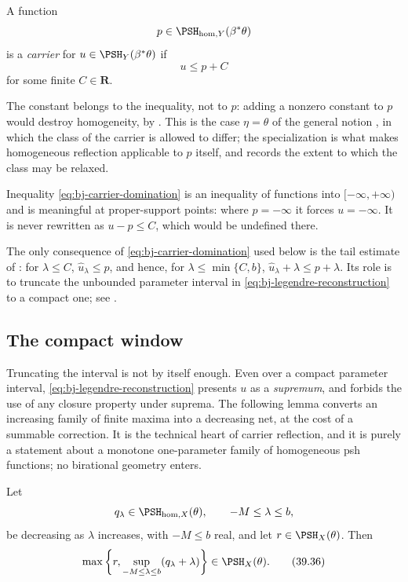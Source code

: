 \begin{definition}
\label{def:bj-homogeneous-carrier}
A function
\[
              p\in\PSH_{\mathrm{hom},Y}(\beta^*\theta)
\]
is a \emph{carrier} for $u\in\PSH_Y(\beta^*\theta)$ if
\[
                              u\le p+C
\tag{39.35}\label{eq:bj-carrier-domination}
\]
for some finite $C\in\mathbf R$.
\end{definition}

The constant belongs to the inequality, not to $p$: adding a nonzero
constant to $p$ would destroy homogeneity, by
.  This is the case
$\eta=\theta$ of the general notion , in which the
class of the carrier is allowed to differ; the specialization is what makes
homogeneous reflection applicable to $p$ itself, and
 records the extent to which the class
may be relaxed.

Inequality \eqref{eq:bj-carrier-domination} is an inequality of functions
into $[-\infty,+\infty)$ and is meaningful at proper-support points: where
$p=-\infty$ it forces $u=-\infty$.  It is never rewritten as
$u-p\le C$, which would be undefined there.

The only consequence of \eqref{eq:bj-carrier-domination} used below is the
tail estimate of : for $\lambda\le C$,
$\widehat u_\lambda\le p$, and hence, for
$\lambda\le\min\{C,b\}$,
$\widehat u_\lambda+\lambda\le p+\lambda$.  Its role is to truncate the
unbounded parameter interval in
\eqref{eq:bj-legendre-reconstruction} to a compact one; see
.

\subsection{The compact window}
\label{sec:ch39-window}

Truncating the interval is not by itself enough.  Even over a compact
parameter interval, \eqref{eq:bj-legendre-reconstruction} presents $u$ as
a \emph{supremum}, and  forbids the use of any
closure property under suprema.  The following lemma converts an increasing
family of finite maxima into a decreasing net, at the cost of a summable
correction.  It is the technical heart of carrier reflection, and it is
purely a statement about a monotone one-parameter family of homogeneous psh
functions; no birational geometry enters.

\begin{lemma}
\label{lem:bj-compact-legendre-window}
Let
\[
 q_\lambda\in\PSH_{\mathrm{hom},X}(\theta),
 \qquad -M\le\lambda\le b,
\]
be decreasing as $\lambda$ increases, with $-M\le b$ real, and let
$r\in\PSH_X(\theta)$.  Then
\[
 \max\left\{r,
   \sup_{-M\le\lambda\le b}(q_\lambda+\lambda)\right\}
 \in\PSH_X(\theta).
\tag{39.36}\label{eq:bj-compact-legendre-window}
\]
\end{lemma}

